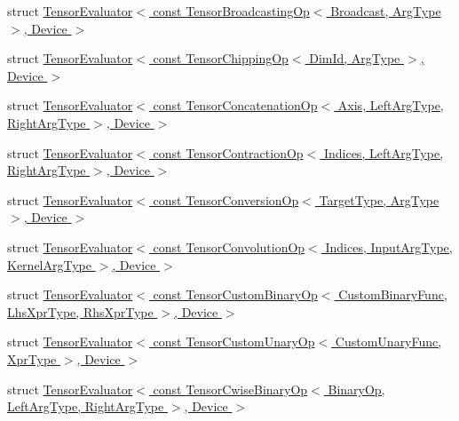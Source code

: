 \begin{DoxyCompactItemize}
\item 
struct \hyperlink{struct_eigen_1_1_tensor_evaluator_3_01const_01_tensor_broadcasting_op_3_01_broadcast_00_01_arg_type_01_4_00_01_device_01_4}{Tensor\+Evaluator$<$ const Tensor\+Broadcasting\+Op$<$ Broadcast, Arg\+Type $>$, Device $>$}
\item 
struct \hyperlink{struct_eigen_1_1_tensor_evaluator_3_01const_01_tensor_chipping_op_3_01_dim_id_00_01_arg_type_01_4_00_01_device_01_4}{Tensor\+Evaluator$<$ const Tensor\+Chipping\+Op$<$ Dim\+Id, Arg\+Type $>$, Device $>$}
\item 
struct \hyperlink{struct_eigen_1_1_tensor_evaluator_3_01const_01_tensor_concatenation_op_3_01_axis_00_01_left_arg_e37e1b61d31098a96aab7c22793b325c}{Tensor\+Evaluator$<$ const Tensor\+Concatenation\+Op$<$ Axis, Left\+Arg\+Type, Right\+Arg\+Type $>$, Device $>$}
\item 
struct \hyperlink{struct_eigen_1_1_tensor_evaluator_3_01const_01_tensor_contraction_op_3_01_indices_00_01_left_arg1f297d3eabde0efec8e4d9b1aa9abe5a}{Tensor\+Evaluator$<$ const Tensor\+Contraction\+Op$<$ Indices, Left\+Arg\+Type, Right\+Arg\+Type $>$, Device $>$}
\item 
struct \hyperlink{struct_eigen_1_1_tensor_evaluator_3_01const_01_tensor_conversion_op_3_01_target_type_00_01_arg_type_01_4_00_01_device_01_4}{Tensor\+Evaluator$<$ const Tensor\+Conversion\+Op$<$ Target\+Type, Arg\+Type $>$, Device $>$}
\item 
struct \hyperlink{struct_eigen_1_1_tensor_evaluator_3_01const_01_tensor_convolution_op_3_01_indices_00_01_input_ar27ed28dccb4630db304c3ad822c3d857}{Tensor\+Evaluator$<$ const Tensor\+Convolution\+Op$<$ Indices, Input\+Arg\+Type, Kernel\+Arg\+Type $>$, Device $>$}
\item 
struct \hyperlink{struct_eigen_1_1_tensor_evaluator_3_01const_01_tensor_custom_binary_op_3_01_custom_binary_func_0fea6836b993af318b6a5ab54d775368f}{Tensor\+Evaluator$<$ const Tensor\+Custom\+Binary\+Op$<$ Custom\+Binary\+Func, Lhs\+Xpr\+Type, Rhs\+Xpr\+Type $>$, Device $>$}
\item 
struct \hyperlink{struct_eigen_1_1_tensor_evaluator_3_01const_01_tensor_custom_unary_op_3_01_custom_unary_func_00_c98bd2331846ae9855eae47ba436125b}{Tensor\+Evaluator$<$ const Tensor\+Custom\+Unary\+Op$<$ Custom\+Unary\+Func, Xpr\+Type $>$, Device $>$}
\item 
struct \hyperlink{struct_eigen_1_1_tensor_evaluator_3_01const_01_tensor_cwise_binary_op_3_01_binary_op_00_01_left_d0674d2fbf9b5f3fd40347d3eda7a38d}{Tensor\+Evaluator$<$ const Tensor\+Cwise\+Binary\+Op$<$ Binary\+Op, Left\+Arg\+Type, Right\+Arg\+Type $>$, Device $>$}

\end{DoxyCompactItemize}
